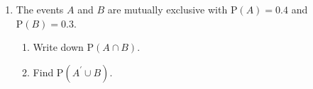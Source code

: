 \documentclass[12pt, twoside]{article}
\begin{document}
\begin{enumerate}
    \item The events $A$ and $B$ are mutually exclusive with $\mathrm P(A)=0.4$ and $\mathrm P(B)=0.3$.
    \begin{enumerate}[itemsep=2cm]
        \item Write down $\mathrm P(A \cap B)$.
        \item Find $\mathrm P(A^\prime \cup B)$.
    \end{enumerate}

\end{enumerate}
\end{document}
